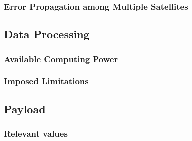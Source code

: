 \documentclass[a4paper,10pt]{article}
\begin{document}
\subsubsection{Error Propagation among Multiple Satellites}

\subsection{Data Processing}
\subsubsection{Available Computing Power}
\subsubsection{Imposed Limitations}

\subsection{Payload}
\subsubsection{Relevant values}
\end{document}
